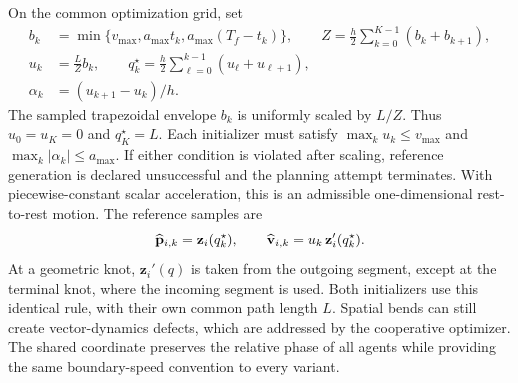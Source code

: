 On the common optimization grid, set
\begin{subequations}\label{eq:scalarprofile}\begin{align}
 b_k&=\min\{v_{\max},a_{\max}t_k,a_{\max}(T_f-t_k)\},\qquad
 Z=\frac h2\sum_{k=0}^{K-1}(b_k+b_{k+1}),\\
 u_k&=\frac LZ b_k,\qquad
 q_k^\star=\frac h2\sum_{\ell=0}^{k-1}(u_\ell+u_{\ell+1}),\\
 \alpha_k&=(u_{k+1}-u_k)/h .
\end{align}\end{subequations}
The sampled trapezoidal envelope $b_k$ is uniformly scaled by $L/Z$. Thus $u_0=u_K=0$ and $q_K^\star=L$. Each initializer must satisfy
$\max_k u_k\leq v_{\max}$ and $\max_k|\alpha_k|\leq a_{\max}$.
If either condition is violated after scaling, reference generation is declared unsuccessful and the planning attempt terminates.
With piecewise-constant scalar acceleration, this is an admissible one-dimensional rest-to-rest motion. The reference samples are
\begin{equation}
 \widehat{\mathbf{p}}_{i,k}=\mathbf z_i(q_k^\star),\qquad
 \widehat{\mathbf{v}}_{i,k}=u_k\,\mathbf z_i'(q_k^\star).
 \label{eq:reference}
\end{equation}
At a geometric knot, $\mathbf z_i'(q)$ is taken from the outgoing segment, except at the terminal knot, where the incoming segment is used. Both initializers use this identical rule, with their own common path length $L$. Spatial bends can still create vector-dynamics defects, which are addressed by the cooperative optimizer. The shared coordinate preserves the relative phase of all agents while providing the same boundary-speed convention to every variant.
